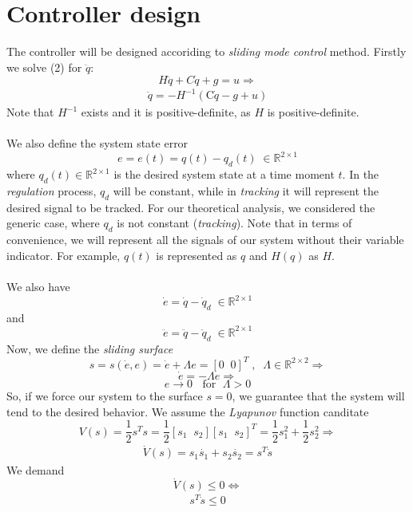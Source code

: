 \documentclass[a4paper]{article}
\newcommand\ddotq{\ddot{q}}
\newcommand\R{\mathbb{R}}
\begin{document}
\section{Controller design}
    The controller will be designed accoriding to \textit{sliding mode control} method. 
    Firstly we solve (2) for $\ddotq$:
    $$
        H \ddot{q}+C \dot{q}+g=u \Rightarrow 
    $$
    \begin{align}
        \ddot{q}=-H^{-1} \left( \mathrm{C} \dot{q} - g+ u \right)
    \end{align}
    Note that $H^{-1}$ exists and it is positive-definite, as $H$ is positive-definite. \\\\
    We also define the system state error 
    $$
        e = e(t) = q(t)-q_{d}(t) \; \in \R^{2 \times 1}
    $$
    where $q_d (t) \in \R^{2 \times 1}$ is the desired system state at a time moment $t$. In the \textit{regulation}
    process, $q_d$ will be constant, while in \textit{tracking} it will represent the desired signal to be tracked. 
    For our theoretical analysis, we considered the generic case, where $q_d$ is not constant (\textit{tracking}). 
    Note that in terms of convenience, we will represent all the signals of our system without their variable indicator.
    For example, $q(t)$ is represented as $q$ and $H(q)$ as $H$.
    \\\\
    We also have 
    $$
        \dot{e}=\dot{q}-\dot{q}_{d} \; \in \R^{2 \times 1}
    $$
    and
    $$
        \ddot{e}=\ddot{q}-\ddot{q}_{d} \; \in \R^{2 \times 1}
    $$
    Now, we define the \textit{sliding surface} 
    $$
        s = s(\dot{e}, e)=\dot{e}+\Lambda e = [0 \; \; 0]^T \;, \;\; \Lambda \in \R ^ {2\times2}\Rightarrow
    $$
    $$
        \dot{e}=-\Lambda e \Rightarrow 
    $$
    $$
        e \rightarrow 0 \;\; \text { for } \;\Lambda>0 
    $$
    So, if we force our system to the surface $s=0$, we guarantee that the system will tend to the desired behavior.
    We assume the \textit{Lyapunov} function canditate 
    $$
        V(s) = \frac{1}{2} s^T s = \frac{1}{2} \left[ s_1 \;\; s_2 \right] \left[ s_1 \;\; s_2 \right]^T = \frac{1}{2} s_1 ^2 + \frac{1}{2} s_2 ^2 \Rightarrow
    $$
    \begin{align}
        \dot{V}(s) = s_1 \dot{s_1} + s_2 \dot{s_2} = s^T \dot{s}        
    \end{align}
    We demand 
    $$
        \dot{V}(s) \le 0 \Leftrightarrow
    $$
    \begin{align}
        s^T \dot{s} \le 0       
    \end{align}
\end{document}
